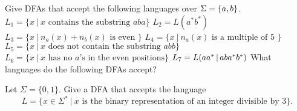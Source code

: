 \begin{exercises}
\problem Give DFAs that accept the following languages over $\Sigma =\mbox{$\{a,b\}$}$.
\ppart $L_1= \{ x \ | \ x \mbox{ contains the substring } aba\}$
\ppart $L_2= L(a^*b^*)$
\ppart $L_3= \{ x \ | \ n_a(x)+n_b(x) \mbox{ is even }\}$
\ppart $L_4= \{ x \ | \ n_a(x) \mbox{ is a multiple of 5 }\}$
\ppart $L_5= \{ x \ | \ x \mbox{ does not contain the substring } abb\}$
\ppart $L_6= \{ x \ | \ x \mbox{ has no $a$'s in the even positions} \}$
\ppart $L_7 = L(aa^* \hbox{$\,|\,$}  aba^*b^*)$
\problem What languages do the following DFAs accept?

\fsafig{1ex}

\fsafig{2ex}


\problem Let $\Sigma=\{0,1\}$. Give a DFA that accepts the language 
$$ L = \{ x \in \Sigma^* \ | \ x \mbox{ is the binary representation of an integer
divisible by 3}\}.$$ 

\end{exercises}




